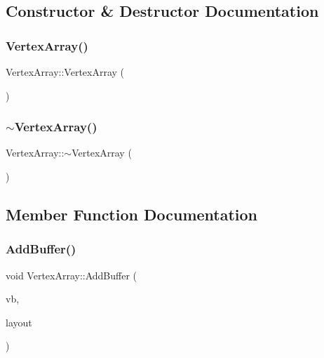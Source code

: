 \subsection{Constructor \& Destructor Documentation}
\mbox{\label{class_vertex_array_ab8a2dcce9698f96dac5f9a19c6979d03}} 
\subsubsection{\texorpdfstring{Vertex\+Array()}{VertexArray()}}
{\footnotesize\ttfamily Vertex\+Array\+::\+Vertex\+Array (\begin{DoxyParamCaption}{ }\end{DoxyParamCaption})}

\mbox{\label{class_vertex_array_a82597eb9daba5ad66dd3cf898e159a95}} 
\subsubsection{\texorpdfstring{$\sim$\+Vertex\+Array()}{~VertexArray()}}
{\footnotesize\ttfamily Vertex\+Array\+::$\sim$\+Vertex\+Array (\begin{DoxyParamCaption}{ }\end{DoxyParamCaption})}



\subsection{Member Function Documentation}
\mbox{\label{class_vertex_array_a994a9dc780ecc0c725b0814a9e7ab532}} 
\subsubsection{\texorpdfstring{Add\+Buffer()}{AddBuffer()}}
{\footnotesize\ttfamily void Vertex\+Array\+::\+Add\+Buffer (\begin{DoxyParamCaption}\item[{const \mbox{\hyperlink{class_vertex_buffer}{Vertex\+Buffer}} \&}]{vb,  }\item[{const \mbox{\hyperlink{class_vertex_buffer_layout}{Vertex\+Buffer\+Layout}} \&}]{layout }\end{DoxyParamCaption})}

